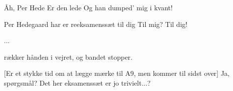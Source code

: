 \documentclass{ucph-revy}
\begin{document}
\begin{song}%

   Åh, Per Hede
             Er den lede
             Og han dumped' mig i kvant!

   Per Hedegaard har er reeksamenssæt til dig
   Til mig?
   Til dig!

  \scene ...

   rækker hånden i vejret, og bandet stopper.
\end{song}%
\begin{sketch}
  [Er et stykke tid om at lægge mærke til A9, men kommer til
  sidst over] Ja, spørgsmål?
   Det her eksamenssæt er jo trivielt...?
\end{sketch}
\end{document}
